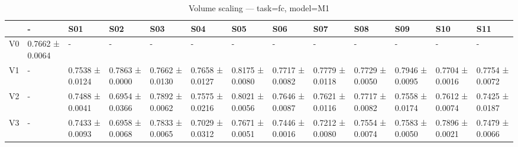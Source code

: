 \begin{table}[htbp]
\centering
\caption{Volume scaling — task=fc, model=M1}
\label{tab:volume:fc:M1}
\begin{tabular}{lllllllllllll}
\toprule
\toprule
 & - & S01 & S02 & S03 & S04 & S05 & S06 & S07 & S08 & S09 & S10 & S11 \\
\midrule
\midrule
V0 & 0.7662 ± 0.0064 & - & - & - & - & - & - & - & - & - & - & - \\
V1 & - & 0.7538 ± 0.0124 & 0.7863 ± 0.0000 & 0.7662 ± 0.0130 & 0.7658 ± 0.0127 & 0.8175 ± 0.0080 & 0.7717 ± 0.0082 & 0.7779 ± 0.0118 & 0.7729 ± 0.0050 & 0.7946 ± 0.0095 & 0.7704 ± 0.0016 & 0.7754 ± 0.0072 \\
V2 & - & 0.7488 ± 0.0041 & 0.6954 ± 0.0366 & 0.7892 ± 0.0062 & 0.7575 ± 0.0216 & 0.8021 ± 0.0056 & 0.7646 ± 0.0087 & 0.7621 ± 0.0116 & 0.7717 ± 0.0082 & 0.7558 ± 0.0174 & 0.7612 ± 0.0074 & 0.7425 ± 0.0187 \\
V3 & - & 0.7433 ± 0.0093 & 0.6958 ± 0.0068 & 0.7833 ± 0.0065 & 0.7029 ± 0.0312 & 0.7671 ± 0.0051 & 0.7446 ± 0.0016 & 0.7212 ± 0.0080 & 0.7554 ± 0.0074 & 0.7583 ± 0.0050 & 0.7896 ± 0.0021 & 0.7479 ± 0.0066 \\
\bottomrule
\end{tabular}\end{table}
